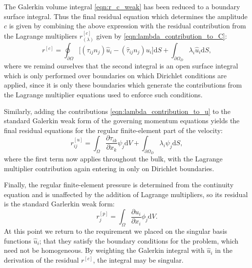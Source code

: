 \documentclass[12pt,a4paper]{article}
\numberwithin{equation}{section}
\newcommand{\D}{\mathrm{d}}
\begin{document}
The Galerkin volume integral \eqref{eqn:r_c_weak} has been reduced to a boundary surface integral. Thus the final residual equation which determines the amplitude $c$ is given by combining the above expression with the residual contribution from the Lagrange multipliers $r_{(\lambda)}^{[c]}$ given by \eqref{eqn:lambda_contribution_to_C}:
\begin{equation} 
  r^{[c]} = \oint_{\partial\Omega}\big[ (\tau_{ij}n_j)\hat u_i - (\hat\tau_{ij}n_j) u_i\big] \D S + \int_{\partial\Omega_D}\lambda_i\hat u_i\D S,
  \label{eqn:residual_c} 
\end{equation}
where we remind ourselves that the second integral is an open surface integral which is only performed over boundaries on which Dirichlet conditions are applied, since it is only these boundaries which generate the contributions from the Lagrange multiplier equations used to enforce such conditions.

Similarly, adding the contributions \eqref{eqn:lambda_contribution_to_u} to the standard Galerkin weak form of the governing momentum equations yields the final residual equations for the regular finite-element part of the velocity:
\begin{equation}
  r^{[u]}_{ij} =  \int_{\Omega} \frac{\partial \tau_{ik}}{\partial x_k} \psi_j\D V + \int_{\partial\Omega_D} \lambda_i\psi_j \D S,
  \label{eqn:residual_velocity}
\end{equation}
where the first term now applies throughout the bulk, with the Lagrange multiplier contribution again entering in only on Dirichlet boundaries.

Finally, the regular finite-element pressure is determined from the continuity equation and is unaffected by the addition of Lagrange multipliers, so its residual is the standard Garlerkin weak form:
\begin{equation}
  r^{[p]}_{j} = \int_{\Omega} \frac{\partial u_i}{\partial x_i}\phi_j \D V.
\end{equation}
At this point we return to the requirement we placed on the singular basis functions $\hat u_i$; that they satisfy the boundary conditions for the problem, which need not be homogeneous. By weighting the Galerkin integral with $\hat u_i$ in the derivation of the residual $r^{[c]}$, the integral may be singular.
\end{document}
